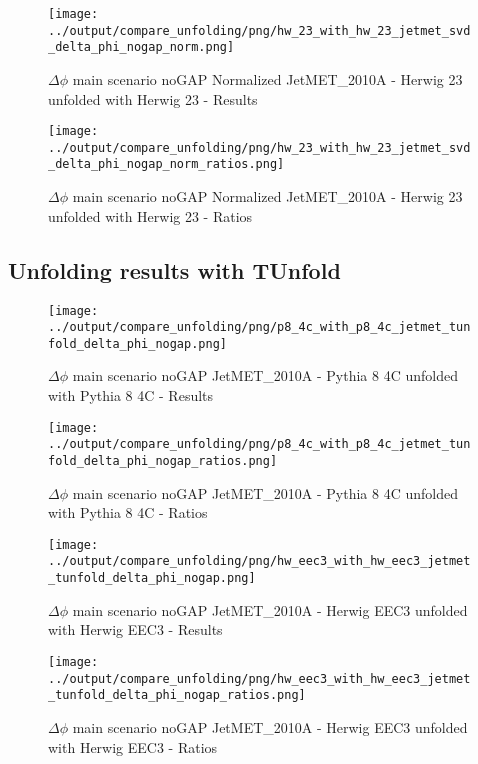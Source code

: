 \documentclass[11pt]{book}
\begin{document}
\begin{figure}[ht]
\centering
\texttt{[image: ../output/compare\_unfolding/png/hw\_23\_with\_hw\_23\_jetmet\_svd\_delta\_phi\_nogap\_norm.png]}
\caption{$\Delta\phi$ main scenario noGAP Normalized JetMET\_2010A - Herwig 23 unfolded with Herwig 23 - Results}
\label{hw_23_hw_23_jetmet_svd_delta_phi_nogap_norm_a}
\end{figure}

\begin{figure}[ht]
\centering
\texttt{[image: ../output/compare\_unfolding/png/hw\_23\_with\_hw\_23\_jetmet\_svd\_delta\_phi\_nogap\_norm\_ratios.png]}
\caption{$\Delta\phi$ main scenario noGAP Normalized JetMET\_2010A - Herwig 23 unfolded with Herwig 23 - Ratios}
\label{hw_23_hw_23_jetmet_svd_delta_phi_nogap_norm_b}
\end{figure}




\clearpage
\subsection{Unfolding results with TUnfold}

\begin{figure}[ht]
\centering
\texttt{[image: ../output/compare\_unfolding/png/p8\_4c\_with\_p8\_4c\_jetmet\_tunfold\_delta\_phi\_nogap.png]}
\caption{$\Delta\phi$ main scenario noGAP JetMET\_2010A - Pythia 8 4C unfolded with Pythia 8 4C - Results}
\label{p8_p8_jetmet_tunfold_delta_phi_nogap_a}
\end{figure}

\begin{figure}[ht]
\centering
\texttt{[image: ../output/compare\_unfolding/png/p8\_4c\_with\_p8\_4c\_jetmet\_tunfold\_delta\_phi\_nogap\_ratios.png]}
\caption{$\Delta\phi$ main scenario noGAP JetMET\_2010A - Pythia 8 4C unfolded with Pythia 8 4C - Ratios}
\label{p8_p8_jetmet_tunfold_delta_phi_nogap_b}
\end{figure}

\begin{figure}[ht]
\centering
\texttt{[image: ../output/compare\_unfolding/png/hw\_eec3\_with\_hw\_eec3\_jetmet\_tunfold\_delta\_phi\_nogap.png]}
\caption{$\Delta\phi$ main scenario noGAP JetMET\_2010A - Herwig EEC3 unfolded with Herwig EEC3 - Results}
\label{hw_eec3_hw_eec3_jetmet_tunfold_delta_phi_nogap_a}
\end{figure}

\begin{figure}[ht]
\centering
\texttt{[image: ../output/compare\_unfolding/png/hw\_eec3\_with\_hw\_eec3\_jetmet\_tunfold\_delta\_phi\_nogap\_ratios.png]}
\caption{$\Delta\phi$ main scenario noGAP JetMET\_2010A - Herwig EEC3 unfolded with Herwig EEC3 - Ratios}
\label{hw_eec3_hw_eec3_jetmet_tunfold_delta_phi_nogap_b}
\end{figure}
\end{document}
